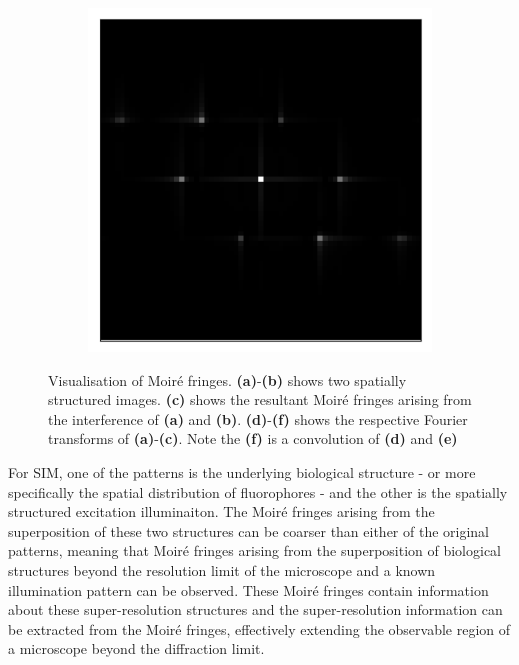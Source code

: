 \begin{figure}[h]
\begin{subfigure}[t]{0.3\textwidth}
		\caption{}
		\label{fig:fringes_2_ft}
	\end{subfigure}
	\begin{subfigure}[t]{0.3\textwidth}
		\centering
		\includegraphics[width=\linewidth]{images/fringes_moire_ft_kx_16_and_12_ky_0_and_12.png}
		\caption{}
		\label{fig:fringes_moire_ft}
	\end{subfigure}
	\caption[Visualisation of Moir\'{e} fringes]{Visualisation of Moir\'{e} 
		fringes. \textbf{(a)}-\textbf{(b)} shows two spatially structured images. 
		\textbf{(c)} shows the resultant Moir\'{e} fringes arising from the 
		interference of \textbf{(a)} and \textbf{(b)}. \textbf{(d)}-\textbf{(f)} 
		shows the respective Fourier transforms of \textbf{(a)}-\textbf{(c)}. 
		Note the \textbf{(f)} is a convolution of \textbf{(d)} and \textbf{(e)}}
	\label{fig:moire_visualisation}
\end{figure}

For SIM, one of the patterns is the underlying biological structure - or more 
specifically the spatial distribution of fluorophores - and the other is the 
spatially structured excitation illuminaiton. The Moir\'{e} fringes arising 
from the superposition of these two structures can be coarser than either of 
the original patterns, meaning that Moir\'{e} fringes arising from the 
superposition of biological structures beyond the resolution limit of the 
microscope and a known illumination pattern can be observed. These Moir\'{e} 
fringes contain information about these super-resolution structures and the
super-resolution information can be extracted from the Moir\'{e} fringes, 
effectively extending the observable region of a microscope beyond the 
diffraction limit\cite{gustafsson2000surpassing}.

